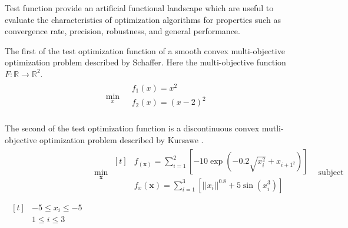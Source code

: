 \label{ap:pareto optimization_test}

Test function provide an artificial functional landscape which are useful to evaluate the characteristics of optimization algorithms for properties such as convergence rate, precision, robustness, and general performance.

The first of the test optimization function of a smooth convex multi-objective optimization problem described by Schaffer\cite{schaffer1984_pareto}.  Here the multi-objective function $F:\mathbb{R} \rightarrow \mathbb{R}^2$.
\begin{equation}
\begin{aligned}
  &\min_{x}
      \begin{aligned}
           &f_1(x) = x^2 \\
           &f_2(x) = (x-2)^2 \\
      \end{aligned}
\end{aligned}
\end{equation}

The second of the test optimization function is a discontinuous convex mutli-objective optimization problem described by Kursawe \cite{kursawe1991_pareto}.
\begin{equation}
\begin{aligned}
  &\min_{\bm{x}}
    \begin{aligned}[t]
      &f_(\bm{x}) = \sum_{i=1}^2
          \left[
            -10 \exp\left(-0.2 \sqrt{x_i^2} + x_{i+1^2}\right)
          \right] \\
      &f_x(\bm{x}) = \sum_{i=1}^3 \left[ \vert|x_{i} \vert|^{0.8} + 5\sin(x_i^3)\right] \\
    \end{aligned}
  &\text{subject to} \\
    \begin{aligned}[t]
      &-5 \leq x_i \leq -5 \\
      & 1 \leq i \leq 3 \\
    \end{aligned}
  \end{aligned}
\end{equation}
